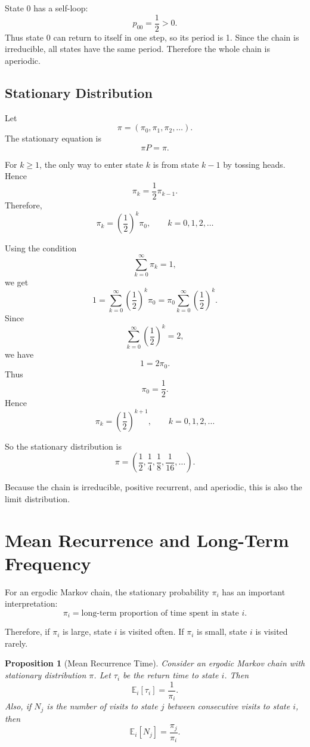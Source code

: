 \documentclass[12pt,a4paper]{article}
\theoremstyle{lecturestyle}
\newtheorem{proposition}{Proposition}
\newcommand{\E}{\mathbb{E}}
\begin{document}
State 0 has a self-loop:
\[
p_{00}=\frac12>0.
\]
Thus state 0 can return to itself in one step, so its period is 1. Since the chain is irreducible, all states have the same period. Therefore the whole chain is aperiodic.

\subsection{Stationary Distribution}

Let
\[
\pi=(\pi_0,\pi_1,\pi_2,\ldots).
\]
The stationary equation is
\[
\pi P=\pi.
\]

For $k\geq1$, the only way to enter state $k$ is from state $k-1$ by tossing heads. Hence
\[
\pi_k=\frac12\pi_{k-1}.
\]
Therefore,
\[
\pi_k=\left(\frac12\right)^k\pi_0,
\qquad k=0,1,2,\ldots
\]

Using the condition
\[
\sum_{k=0}^{\infty}\pi_k=1,
\]
we get
\[
1
=
\sum_{k=0}^{\infty}\left(\frac12\right)^k\pi_0
=
\pi_0\sum_{k=0}^{\infty}\left(\frac12\right)^k.
\]
Since
\[
\sum_{k=0}^{\infty}\left(\frac12\right)^k=2,
\]
we have
\[
1=2\pi_0.
\]
Thus
\[
\pi_0=\frac12.
\]
Hence
\[
\pi_k=\left(\frac12\right)^{k+1},
\qquad k=0,1,2,\ldots
\]

So the stationary distribution is
\[
\boxed{
\pi=\left(\frac12,\frac14,\frac18,\frac1{16},\ldots\right).
}
\]

Because the chain is irreducible, positive recurrent, and aperiodic, this is also the limit distribution.

\section{Mean Recurrence and Long-Term Frequency}

For an ergodic Markov chain, the stationary probability $\pi_i$ has an important interpretation:
\[
\pi_i=\text{long-term proportion of time spent in state }i.
\]

Therefore, if $\pi_i$ is large, state $i$ is visited often. If $\pi_i$ is small, state $i$ is visited rarely.

\begin{proposition}[Mean Recurrence Time]
Consider an ergodic Markov chain with stationary distribution $\pi$. Let $\tau_i$ be the return time to state $i$. Then
\[
\E_i[\tau_i]=\frac{1}{\pi_i}.
\]
Also, if $N_j$ is the number of visits to state $j$ between consecutive visits to state $i$, then
\[
\E_i[N_j]=\frac{\pi_j}{\pi_i}.
\]
\end{proposition}
\end{document}
